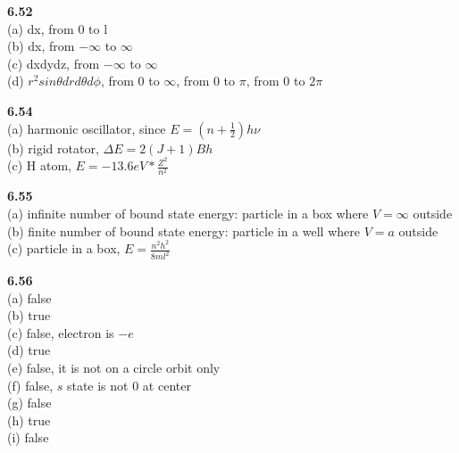 \documentclass{article}
\begin{document}
\textbf{6.52}\\
(a) dx, from 0 to l\\
(b) dx, from $-\infty$ to $\infty$\\
(c) dxdydz, from $-\infty$ to $\infty$\\
(d) $r^2sin\theta drd\theta d\phi$, from $0$ to $\infty$, from 0 to $\pi$, from 0 to $2\pi$\\
\newline

\textbf{6.54}\\
(a) harmonic oscillator, since $E = (n+\frac{1}{2})h\nu$\\
(b) rigid rotator, $\Delta E = 2(J+1)Bh$\\
(c) H atom, $E = -13.6eV*\frac{Z^2}{n^2}$\\
\newline

\textbf{6.55}\\
(a) infinite number of bound state energy: particle in a box where $V = \infty$ outside\\
(b) finite number of bound state energy: particle in a well where $V = a$ outside\\
(c) particle in a box, $E = \frac{n^2h^2}{8ml^2}$\\
\newline

\textbf{6.56}\\
(a) false\\
(b) true\\
(c) false, electron is $-e$\\
(d) true\\
(e) false, it is not on a circle orbit only\\
(f) false, $s$ state is not 0 at center\\
(g) false\\
(h) true\\
(i) false\\
\newline
\end{document}
